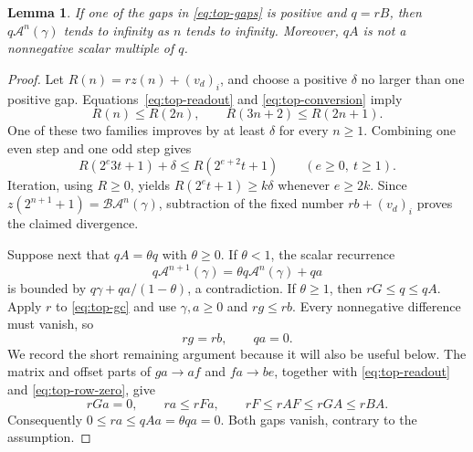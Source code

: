 \documentclass[11pt,a4paper]{article}
\newtheorem{lemma}[theorem]{Lemma}
\begin{document}
\begin{lemma}\label{lem:top-observed-growth}
If one of the gaps in \eqref{eq:top-gaps} is positive and $q=rB$,
then $q\mathcal A^n(\gamma)$ tends to infinity as $n$ tends to infinity.
Moreover, $qA$ is not a nonnegative scalar multiple of $q$.
\end{lemma}
\begin{proof}
Let $R(n)=rz(n)+(v_d)_i$, and choose a positive $\delta$ no larger
than one positive gap. Equations~\eqref{eq:top-readout} and
\eqref{eq:top-conversion} imply
\[
R(n)\le R(2n),\qquad R(3n+2)\le R(2n+1).
\]
One of these two families improves by at least $\delta$ for every
$n\ge1$. Combining one even step and one odd step gives
\[
R(2^e3t+1)+\delta\le R(2^{e+2}t+1)
\qquad(e\ge0,\ t\ge1).
\]
Iteration, using $R\ge0$, yields
$R(2^et+1)\ge k\delta$ whenever $e\ge2k$.
Since $z(2^{n+1}+1)=\mathcal B\mathcal A^n(\gamma)$, subtraction
of the fixed number $rb+(v_d)_i$ proves the claimed divergence.

Suppose next that $qA=\theta q$ with $\theta\ge0$. If $\theta<1$,
the scalar recurrence
\[
q\mathcal A^{n+1}(\gamma)=\theta q\mathcal A^n(\gamma)+qa
\]
is bounded by $q\gamma+qa/(1-\theta)$, a contradiction.
If $\theta\ge1$, then $rG\le q\le qA$. Apply $r$ to
\eqref{eq:top-gc} and use $\gamma,a\ge0$ and $rg\le rb$.
Every nonnegative difference must vanish, so
\begin{equation}\label{eq:top-row-zero}
rg=rb,\qquad qa=0.
\end{equation}
We record the short remaining argument because it will also be useful
below. The matrix and offset parts of $ga\to af$ and $fa\to be$,
together with \eqref{eq:top-readout} and \eqref{eq:top-row-zero}, give
\[
rGa=0,\qquad ra\le rFa,\qquad
rF\le rAF\le rGA\le rBA.
\]
Consequently $0\le ra\le qAa=\theta qa=0$. Both gaps vanish,
contrary to the assumption.
\end{proof}
\end{document}
